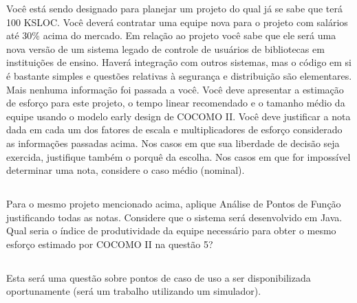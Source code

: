 \documentclass[10pt, a4paper]{report}
\begin{document}
\qquad Você está sendo designado para planejar um projeto do qual já se sabe que
terá 100 KSLOC. Você deverá contratar uma equipe nova para o projeto com
salários até 30\% acima do mercado. Em relação ao projeto você sabe que ele será
uma nova versão de um sistema legado de controle de usuários de bibliotecas em
instituições de ensino. Haverá integração com outros sistemas, mas o código em
si é bastante simples e questões relativas à segurança e distribuição são
elementares. Mais nenhuma informação foi passada a você. Você deve apresentar a
estimação de esforço para este projeto, o tempo linear recomendado e o tamanho
médio da equipe usando o modelo early design de COCOMO II. Você deve justificar
a nota dada em cada um dos fatores de escala e multiplicadores de esforço
considerado as informações passadas acima. Nos casos em que sua liberdade de
decisão seja exercida, justifique também o porquê da escolha. Nos casos em que
for impossível determinar uma nota, considere o caso médio (nominal).

\subsection{}
\qquad Para o mesmo projeto mencionado acima, aplique Análise de Pontos de Função
justificando todas as notas. Considere que o sistema será desenvolvido em Java.
Qual seria o índice de produtividade da equipe necessário para obter o mesmo
esforço estimado por COCOMO II na questão 5?

\subsection{}
\qquad Esta será uma questão sobre pontos de caso de uso a ser disponibilizada
oportunamente (será um trabalho utilizando um simulador).
\end{document}
